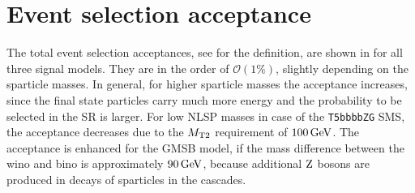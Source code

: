 \section*{Event selection acceptance}
The total event selection acceptances, see  for the definition, are shown in  for all three signal models. They are in the order of $\mathcal{O}(1\%)$, slightly depending on the sparticle masses. In general, for higher sparticle masses the acceptance increases, since the final state particles carry much more energy and the probability to be selected in the SR is larger. For low NLSP masses in case of the \texttt{T5bbbbZG} SMS, the acceptance decreases due to the $M_{\mathrm{T2}}$ requirement of $100\,\text{Ge\hspace{-.08em}V}$. The acceptance is enhanced for the GMSB model, if the mass difference between the wino and bino is approximately $90\,\text{Ge\hspace{-.08em}V}$, because additional $\mathrm{Z}$ bosons are produced in decays of sparticles in the cascades.
